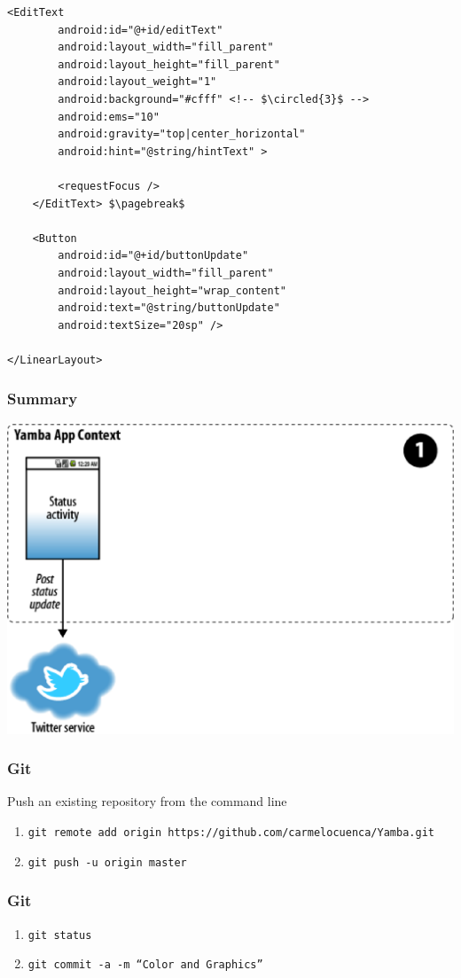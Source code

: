 \begin{frame}
\begin{lstlisting}[caption=res/layout/activity\_status.xml, basicstyle=\scriptsize,escapechar=$]
    <EditText
        android:id="@+id/editText"
        android:layout_width="fill_parent"
        android:layout_height="fill_parent"
        android:layout_weight="1"
        android:background="#cfff" <!-- $\circled{3}$ -->
        android:ems="10"
        android:gravity="top|center_horizontal"
        android:hint="@string/hintText" >

        <requestFocus />
    </EditText> $\pagebreak$

    <Button
        android:id="@+id/buttonUpdate"
        android:layout_width="fill_parent"
        android:layout_height="wrap_content"
        android:text="@string/buttonUpdate"
        android:textSize="20sp" />

</LinearLayout>
\end{lstlisting}
\end{frame}
\begin{frame}
\frametitle{Summary}
\centering
\includegraphics[width=0.65 \textwidth]{fig-64.eps}
\end{frame}
\begin{frame}[fragile]
\frametitle{Git}
Push an existing repository from the command line
\begin{enumerate}
\item \texttt{git remote add origin https://github.com/carmelocuenca/Yamba.git}
\item \texttt{git push -u origin master}
\end{enumerate}
\end{frame}
\begin{frame}[fragile]
\frametitle{Git}
\begin{enumerate}
\item \texttt{git status}
\item \texttt{git commit -a -m ``Color and Graphics''}
\end{enumerate}

\end{frame}



